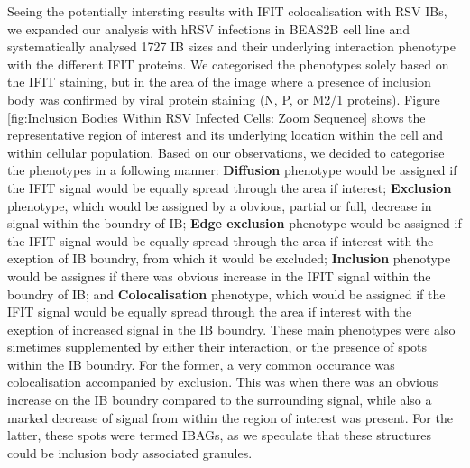 Seeing the potentially intersting results with IFIT colocalisation with RSV IBs, we expanded our analysis with hRSV infections in BEAS2B cell line and systematically analysed 1727 IB sizes and their underlying interaction phenotype with the different IFIT proteins. We categorised the phenotypes solely based on the IFIT staining, but in the area of the image where a presence of inclusion body was confirmed by viral protein staining (N, P, or M2/1 proteins). Figure \ref{fig:Inclusion Bodies Within RSV Infected Cells: Zoom Sequence} shows the representative region of interest and its underlying location within the cell and within cellular population. Based on our observations, we decided to categorise the phenotypes in a following manner: \textbf{Diffusion} phenotype would be assigned if the IFIT signal would be equally spread through the area if interest; \textbf{Exclusion} phenotype, which would be assigned by a obvious, partial or full, decrease in signal within the boundry of IB; \textbf{Edge exclusion} phenotype would be assigned if the IFIT signal would be equally spread through the area if interest with the exeption of IB boundry, from which it would be excluded; \textbf{Inclusion} phenotype would be assignes if there was obvious increase in the IFIT signal within the boundry of IB; and \textbf{Colocalisation} phenotype, which would be assigned if the IFIT signal would be equally spread through the area if interest with the exeption of increased signal in the IB boundry. These main phenotypes were also simetimes supplemented by either their interaction, or the presence of spots within the IB boundry. For the former, a very common occurance was colocalisation accompanied by exclusion. This was when there was an obvious increase on the IB boundry compared to the surrounding signal, while also a marked decrease of signal from within the region of interest was present. For the latter, these spots were termed IBAGs, as we speculate that these structures could be inclusion body associated granules. 

